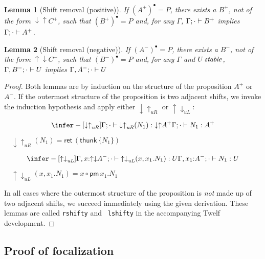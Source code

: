 \documentclass[acmtocl]{robtrans}\pdfoutput=1
\newtheorem{lemma}{Lemma}
\newcommand{\ifoc}[3]{{#1}; {#2} \vdash {#3} \mathstrut}
\newcommand{\ifoct}[4]{{#1}; {#2} \vdash {#3} : {#4} \mathstrut}
\newcommand{\stable}[1]{{#1}\,\mathit{stable} \mathstrut}
\newcommand{\dsrt}[1]{\mathsf{thunk}\,{#1}}
\newcommand{\dslt}[2]{{#1}.{#2}}      \newcommand{\usrt}[1]{\{{#1}\}}       \newcommand{\uslt}[1]{\mathsf{pm}\,{#1}}
\newcommand{\rft}[1]{\mathsf{ret}\,{#1}} \newcommand{\lft}[2]{{#1} \circ {#2}}
\begin{document}
\begin{lemma}[Shift removal (positive)]

If $(A^+)^\bullet = P$, there exists a $B^+$, 
  not of the form ${\downarrow}{\uparrow}C^+$, such that
$(B^+)^\bullet = P$ and, for any $\Gamma$, $\ifoc{\Gamma}{\cdot}{B^+}$
implies $\ifoc{\Gamma}{\cdot}{A^+}$.
\end{lemma}

\begin{lemma}[Shift removal (negative)] 

If $(A^-)^\bullet = P$, there exists a $B^-$, 
  not of the form ${\uparrow}{\downarrow}C^-$, such that
$(B^-)^\bullet = P$ and, for any $\Gamma$ and $\stable{U}$,
$\ifoc{\Gamma, B^-}{\cdot}{U}$ implies $\ifoc{\Gamma, A^-}{\cdot}{U}$
\end{lemma}

\begin{proof}
Both lemmas are by induction on the structure of the proposition $A^+$
or $A^-$. If the outermost structure of the proposition is two
adjacent shifts, we invoke the induction hypothesis and apply either
${\downarrow}{\uparrow}_{uR}$ or
${\uparrow}{\downarrow}_{uL}$:

\[
\infer-[\mathit{{\downarrow}{\uparrow}_{uR}}]
{\ifoct{\Gamma}{\cdot}
       {\mathit{{\downarrow}{\uparrow}_{uR}}(N_1)}
       {{\downarrow}{\uparrow}A^+}}
{\ifoct{\Gamma}{\cdot}{N_1}{A^+}}
\]

$\quad\mathit{{\downarrow}{\uparrow}_{uR}}(N_1) =
 \rft{(\dsrt{\usrt{N_1}})}$

\[
\infer-[\mathit{{\uparrow}{\downarrow}_{uL}}]
{\ifoct{\Gamma, x{:}{\uparrow}{\downarrow}A^-}{\cdot}
       {\mathit{{\uparrow}{\downarrow}_{uL}}(x,x_1.N_1)}{U}}
{\ifoct{\Gamma, x_1{:}A^-}{\cdot}{N_1}{U}}
\]

$\quad\mathit{{\uparrow}{\downarrow}_{uL}}(x,x_1.N_1) =
  \lft{x}{\uslt{\dslt{x_1}{N_1}}}$

\bigskip
\noindent
In all cases where the outermost structure of the proposition is {\em
  not} made up of two adjacent shifts, we succeed immediately using
the given derivation.  These lemmas are called {\tt rshifty} and {\tt
  lshifty} in the accompanying Twelf development.
\end{proof}




\subsection{Proof of focalization}
\label{sec:focalizationproof}
\end{document}
